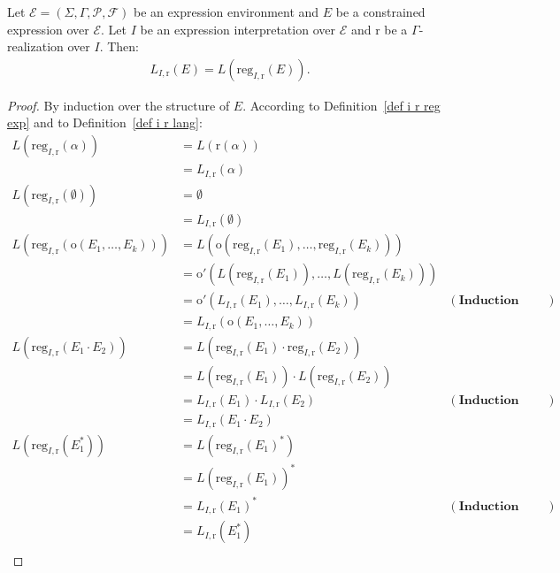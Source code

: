 \documentclass[a4paper]{llncs}
\begin{document}
  \begin{proposition}
    Let $\mathcal{E}=(\Sigma,\Gamma,\mathcal{P},\mathcal{F})$ be an expression environment and $E$ be a constrained expression over $\mathcal{E}$. Let $I$ be an expression interpretation over $\mathcal{E}$ and $\mathrm{r}$ be a $\Gamma$-realization over $I$. Then:
    \begin{align*}
      L_{I,\mathrm{r}}(E)=L(\mathrm{reg}_{I,\mathrm{r}}(E)).
    \end{align*}
  \end{proposition}
  \begin{proof}
    By induction over the structure of $E$. According to Definition~\ref{def i r reg exp} and to Definition~\ref{def i r lang}:
    \begin{align*}
      L(\mathrm{reg}_{I,\mathrm{r}}(\alpha))&=L(\mathrm{r}(\alpha))\\
      &=L_{I,\mathrm{r}}(\alpha)\\
L(\mathrm{reg}_{I,\mathrm{r}}(\emptyset))&=\emptyset\\
      &=L_{I,\mathrm{r}}(\emptyset)\\
L(\mathrm{reg}_{I,\mathrm{r}}(\mathrm{o}(E_1,\ldots,E_k))) & =L(\mathrm{o}(\mathrm{reg}_{I,\mathrm{r}}(E_1),\ldots,\mathrm{reg}_{I,\mathrm{r}}(E_k)))\\
      & =\mathrm{o'}(L(\mathrm{reg}_{I,\mathrm{r}}(E_1)),\ldots,L(\mathrm{reg}_{I,\mathrm{r}}(E_k)))\\
      & =\mathrm{o'}(L_{I,\mathrm{r}}(E_1),\ldots,L_{I,\mathrm{r}}(E_k)) & (\textbf{Induction hypothesis})\\
      & =L_{I,\mathrm{r}}(\mathrm{o}(E_1,\ldots,E_k))\\
      L(\mathrm{reg}_{I,\mathrm{r}}(E_1\cdot E_2)) & =L(\mathrm{reg}_{I,\mathrm{r}}(E_1)\cdot \mathrm{reg}_{I,\mathrm{r}}(E_2))\\
      & =L(\mathrm{reg}_{I,\mathrm{r}}(E_1)) \cdot L(\mathrm{reg}_{I,\mathrm{r}}(E_2))\\
      & =L_{I,\mathrm{r}}(E_1) \cdot L_{I,\mathrm{r}}(E_2)&(\textbf{Induction hypothesis})\\
      & =L_{I,\mathrm{r}}(E_1  \cdot E_2)\\
      L(\mathrm{reg}_{I,\mathrm{r}}(E_1^*)) & =L(\mathrm{reg}_{I,\mathrm{r}}(E_1)^*)\\
      & =L(\mathrm{reg}_{I,\mathrm{r}}(E_1))^*\\
      & =L_{I,\mathrm{r}}(E_1)^*&(\textbf{Induction hypothesis})\\
      & =L_{I,\mathrm{r}}(E_1^*)\\

\end{align*}
\end{proof}
\end{document}
